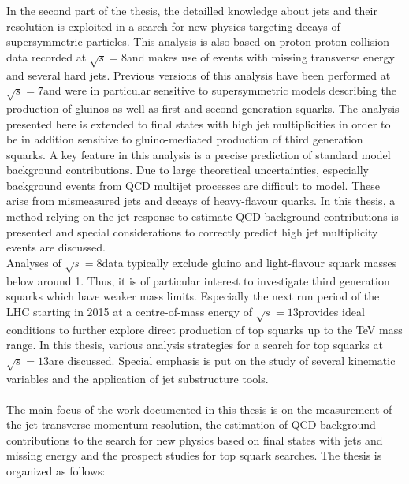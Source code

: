 In the second part of the thesis, the detailled knowledge about jets and their resolution is exploited in a search for new physics targeting decays of supersymmetric particles. This analysis is also based on proton-proton collision data recorded at $\sqrt{s} = 8$\tev and makes use of events with missing transverse energy and several hard jets. Previous versions of this analysis have been performed at $\sqrt{s} = 7$\tev and were in particular sensitive to supersymmetric models describing the production of gluinos as well as first and second generation squarks. The analysis presented here is extended to final states with high jet multiplicities in order to be in addition sensitive to gluino-mediated production of third generation squarks. A key feature in this analysis is a precise prediction of standard model background contributions. Due to large theoretical uncertainties, especially background events from QCD multijet processes are difficult to model. These arise from mismeasured jets and decays of heavy-flavour quarks. In this thesis, a method relying on the jet-\pt response to estimate QCD background contributions is presented and special considerations to correctly predict high jet multiplicity events are discussed.  \\
Analyses of $\sqrt{s} = 8$\tev data typically exclude gluino and light-flavour squark masses below around 1\tev. Thus, it is of particular interest to investigate third generation squarks which have weaker mass limits. Especially the next run period of the LHC starting in 2015 at a centre-of-mass energy of $\sqrt{s} = 13$\tev provides ideal conditions to further explore direct production of top squarks up to the TeV mass range. In this thesis, various analysis strategies for a search for top squarks at $\sqrt{s} = 13$\tev are discussed. Special emphasis is put on the study of several kinematic variables and the application of jet substructure tools. \\ 
\\
The main focus of the work documented in this thesis is on the measurement of the jet transverse-momentum resolution, the estimation of QCD background contributions to the search for new physics based on final states with jets and missing energy and the prospect studies for top squark searches. The thesis is organized as follows:
